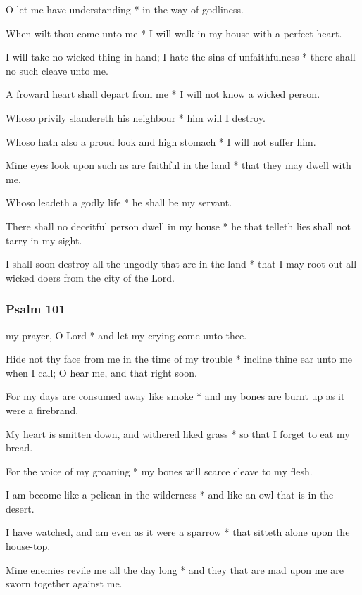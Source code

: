 O let me have understanding * in the way of godliness.

When wilt thou come unto me * I will walk in my house with a perfect heart.

I will take no wicked thing in hand; I hate the sins of unfaithfulness * there shall no such cleave unto me.

A froward heart shall depart from me * I will not know a wicked person.

Whoso privily slandereth his neighbour * him will I destroy.

Whoso hath also a proud look and high stomach * I will not suffer him.

Mine eyes look upon such as are faithful in the land * that they may dwell with me.

Whoso leadeth a godly life * he shall be my servant.

There shall no deceitful person dwell in my house * he that telleth lies shall not tarry in my sight.

I shall soon destroy all the ungodly that are in the land * that I may root out all wicked doers from the city of the Lord.



\subsubsection{Psalm 101}


 my prayer, O Lord * and let my crying come unto thee.

Hide not thy face from me in the time of my trouble * incline thine ear unto me when I call; O hear me, and that right soon.

For my days are consumed away like smoke * and my bones are burnt up as it were a firebrand.

My heart is smitten down, and withered liked grass * so that I forget to eat my bread.

For the voice of my groaning * my bones will scarce cleave to my flesh.

I am become like a pelican in the wilderness * and like an owl that is in the desert.

I have watched, and am even as it were a sparrow * that sitteth alone upon the house-top.

Mine enemies revile me all the day long * and they that are mad upon me are sworn together against me.

